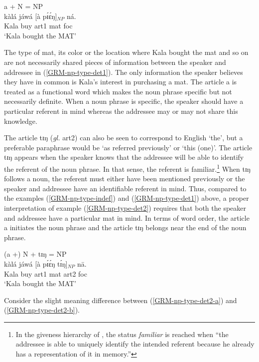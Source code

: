 \begin{exe}
\begin{exe}
\begin{exe}
{\begin{exe}
\begin{exe}
\begin{exe}
 \ex\label{GRM-np-type-det1}{\rm  a + N = NP}\\
\gll  kàlá jáwá  [à pɪ́ɛ́ŋ]$_{NP}$ ná.\\
  Kala buy {\sc art1}  mat {\sc foc}\\
\glt  `Kala bought the MAT' 
\z


The type of mat,  its color or the location where Kala bought the mat and so on
are not necessarily shared pieces of information between the speaker and 
addressee
in (\ref{GRM-np-type-det1}).  The only information the speaker believes they
have in common is Kala's interest in purchasing a mat. The article {\sls a} is 
treated as a functional word which makes the noun phrase specific but not
necessarily
definite.  When a noun phrase is  specific, the speaker should have a particular
referent in mind whereas the addressee may or may not share this knowledge.


The article {\sls tɪŋ}  ({\it gl.} {\sc art2}) can also be seen to correspond to
English `the',  but a preferable paraphrase would be `as referred previously' or
 `this (one)'.  The article {\sls  tɪŋ} appears when the speaker knows that the
addressee will be able to identify the referent of the noun phrase. In that 
sense,
the referent is familiar.\footnote{In the giveness hierarchy of
\citet[278]{Gund93}, the status {\it familiar} is reached when ``the addressee
is able to uniquely identify the intended referent because he already has a
representation of it in memory.''}   When {\sls tɪŋ} follows a noun, the 
referent
must either have been mentioned previously or the speaker and addressee have an
identifiable referent in mind. Thus, compared to the examples
(\ref{GRM-np-type-indef}) and (\ref{GRM-np-type-det1}) above, a proper
interpretation of example (\ref{GRM-np-type-det2}) requires that both the
speaker and addressee have a particular mat in mind. In terms of word order, the
article  {\sls a}  initiates the noun phrase and  the article {\sls tɪŋ}  
belongs
near the end of the noun phrase. 
 

\begin{exe}
 \ex\label{GRM-np-type-det2}{\rm   (a +) N + tɪŋ = NP}\\
\gll  kàlá jáwá  [à pɪ́ɛ́ŋ  tɪ́ŋ]$_{NP}$ nā.\\
  Kala buy {\sc art1}  mat {\sc art2} {\sc foc}\\
\glt  `Kala bought the MAT'
\z

Consider the slight meaning difference between
(\ref{GRM-np-type-det2-a}) and (\ref{GRM-np-type-det2-b}).



\end{exe}
\end{exe}
\end{exe}
\end{exe}}
\end{exe}
\end{exe}
\end{exe}
